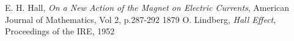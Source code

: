 \documentclass{article}
\begin{document}
	\newpage
	\begin{thebibliography}{9}
			E. H. Hall,
			\emph{On a New Action of the Magnet on Electric Currents},
			American Journal of Mathematics, Vol 2, p.287-292
			1879
			O. Lindberg,
			\emph{Hall Effect},
			Proceedings of the IRE,
			1952
	\end{thebibliography}
\end{document}
